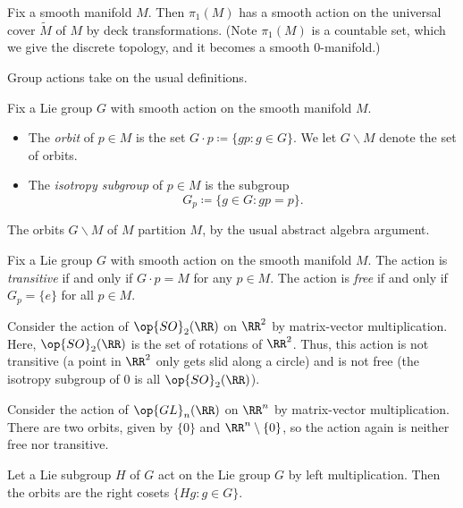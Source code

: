 \documentclass[../notes.tex]{subfiles}
\begin{document}
\begin{example}
	Fix a smooth manifold $M$. Then $\pi_1(M)$ has a smooth action on the universal cover $\widetilde M$ of $M$ by deck transformations. (Note $\pi_1(M)$ is a countable set, which we give the discrete topology, and it becomes a smooth $0$-manifold.)
\end{example}
Group actions take on the usual definitions.
\begin{defihelper}  
	Fix a Lie group $G$ with smooth action on the smooth manifold $M$.
	\begin{itemize}
		\item The \textit{orbit} of $p\in M$ is the set $G\cdot p\coloneqq\{gp:g\in G\}$. We let $G\backslash M$ denote the set of orbits.
		\item The \textit{isotropy subgroup} of $p\in M$ is the subgroup
		\[G_p\coloneqq\{g\in G:gp=p\}.\]
	\end{itemize}
\end{defihelper}
\begin{remark}
	The orbits $G\backslash M$ of $M$ partition $M$, by the usual abstract algebra argument.
\end{remark}
\begin{defihelper}  
	Fix a Lie group $G$ with smooth action on the smooth manifold $M$. The action is \textit{transitive} if and only if $G\cdot p=M$ for any $p\in M$. The action is \textit{free} if and only if $G_p=\{e\}$ for all $p\in M$.
\end{defihelper}
\begin{example}
	Consider the action of $\op{SO}_2(\RR)$ on $\RR^2$ by matrix-vector multiplication. Here, $\op{SO}_2(\RR)$ is the set of rotations of $\RR^2$. Thus, this action is not transitive (a point in $\RR^2$ only gets slid along a circle) and is not free (the isotropy subgroup of $0$ is all $\op{SO}_2(\RR)$).
\end{example}
\begin{example}
	Consider the action of $\op{GL}_n(\RR)$ on $\RR^n$ by matrix-vector multiplication. There are two orbits, given by $\{0\}$ and $\RR^n\setminus\{0\}$, so the action again is neither free nor transitive.
\end{example}
\begin{example}
	Let a Lie subgroup $H$ of $G$ act on the Lie group $G$ by left multiplication. Then the orbits are the right cosets $\{Hg:g\in G\}$.
\end{example}
\end{document}
